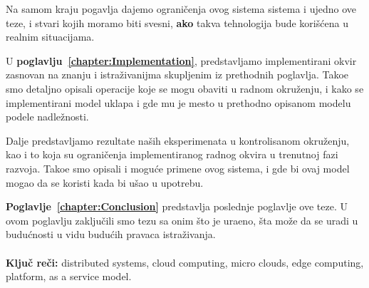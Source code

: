 Na samom kraju pogavlja dajemo ograni\v cenja ovog sistema sistema i ujedno ove teze, i stvari kojih moramo biti svesni, \textbf{ako} takva tehnologija bude kori\v s\'cena u realnim situacijama.

U \textbf{poglavlju~\ref{chapter:Implementation}}, predstavljamo implementirani okvir zasnovan na znanju i istra\v zivanijma skupljenim iz prethodnih poglavlja. Tako\dj e smo detaljno opisali operacije koje se mogu obaviti u radnom okru\v zenju, i kako se implementirani model uklapa i gde mu je mesto u prethodno opisanom modelu podele nadle\v znosti.

Dalje predstavljamo rezultate na\v sih eksperimenata u kontrolisanom okru\v zenju, kao i to koja su ograni\v cenja implementiranog radnog okvira u trenutnoj fazi razvoja. Tako\dj e smo opisali i mogu\'ce primene ovog sistema, i gde bi ovaj model mogao da se koristi kada bi u\v sao u upotrebu.

\textbf{Poglavlje~\ref{chapter:Conclusion}} predstavlja poslednje poglavlje ove teze. U ovom poglavlju zaklju\v cili smo tezu sa onim što je ura\dj eno, \v sta mo\v ze da se uradi u budu\'cnosti u vidu budu\'cih pravaca istra\v zivanja.\\\\

\noindent
\textbf{Klju\v c re\v ci:} distributed systems, cloud computing, micro clouds, edge computing, platform, as a service model.
